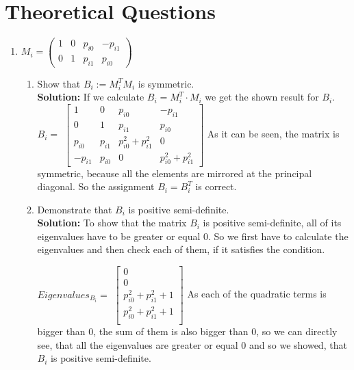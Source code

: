 \documentclass{article}
\numberwithin{equation}{section}
\newcommand{\0}{\mathbf{0}}
\begin{document}
	 \section{Theoretical Questions}
	 \begin{enumerate}
	 	\item $M_{i}=\left(\begin{array}{cccc}{1} & {0} & {p_{i 0}} & {-p_{i 1}} \\ {0} & {1} & {p_{i 1}} & {p_{i 0}}\end{array}\right)$
 		\begin{enumerate}
 		\item Show that $B_{i} :=M_{i}^{T} M_{i}$ is symmetric. \\
 		\newline{}
 		\textbf{Solution:}
 		\newline{}
 		\newline{}
 		If we calculate $B_i = M_i^T \cdot M_i$ we get the shown result for $B_i$.
 		\newline \newline
 		$B_i=$ 
 		$\begin{bmatrix} 
 		1 & 0 & p_{i0} & -p_{i1}\\
 		0 & 1 & p_{i1} & p_{i0}\\
 		p_{i0} & p_{i1} & p_{i0}^2 + p_{i1}^2 & 0\\
 		-p_{i1} & p_{i0} & 0 & p_{i0}^2 + p_{i1}^2
 		\end{bmatrix}$
 		\newline
 		\newline
 		As it can be seen, the matrix is symmetric, because all the elements are mirrored at the principal diagonal. So the assignment $B_i = B_i^T$ is correct. 
 		\newpage
 		
 		\item Demonstrate that $B_{i}$ is positive semi-definite. \\
 		
        
        \textbf{Solution:}
        \newline{}
        \newline{}
        To show that the matrix $B_i$ is positive semi-definite, all of its eigenvalues have to be greater or equal $0$. So we first have to calculate the eigenvalues and then check each of them, if it satisfies the condition. \newline
        
        $Eigenvalues_{B_i}=$
        $\begin{bmatrix} 
        0 \\
        0 \\
        p_{i0}^2 + p_{i1}^2 + 1\\
        p_{i0}^2 + p_{i1}^2 + 1\\
        \end{bmatrix}$
       \newline \newline
       As each of the quadratic terms is bigger than $0$, the sum of them is also bigger than $0$, so we can directly see, that all the eigenvalues are greater or equal $0$ and so we showed, that $B_i$ is positive semi-definite.	
 		

\end{enumerate}
\end{enumerate}
\end{document}
